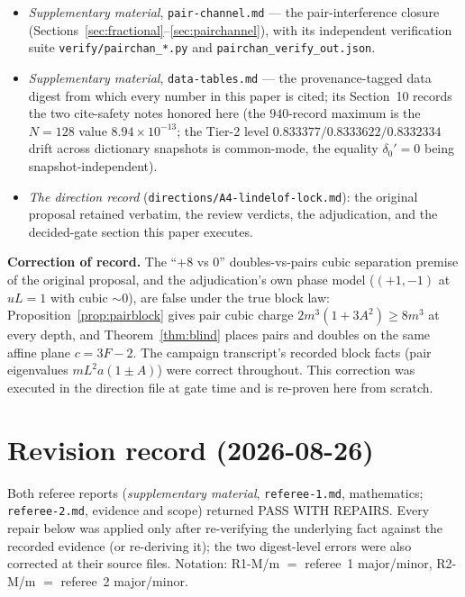 \documentclass[11pt]{article}
\theoremstyle{plain}
\theoremstyle{definition}
\theoremstyle{remark}
\begin{document}
\begin{itemize}
  with their verification scripts and JSON outputs.
\item \emph{Supplementary material}, \texttt{pair-}\allowbreak\texttt{channel.md}
  --- the pair-interference closure
  (Sections~\ref{sec:fractional}--\ref{sec:pairchannel}), with its independent
  verification suite \texttt{verify/}\allowbreak\texttt{pairchan\_*.py}
  and \texttt{pairchan\_}\allowbreak\texttt{verify\_}\allowbreak\texttt{out.json}.
\item \emph{Supplementary material}, \texttt{data-tables.md} --- the
  provenance-tagged data digest from which every number in this paper is cited;
  its Section~10 records the two cite-safety notes honored here (the $940$-record
  maximum is the $N = 128$ value $8.94 \times 10^{-13}$; the Tier-2 level
  $0.833377 / 0.8333622 / 0.8332334$ drift across dictionary snapshots is
  common-mode, the equality $\delta_0' = 0$ being snapshot-independent).
\item \emph{The direction record} (\texttt{directions/A4-lindelof-lock.md}): the original proposal retained verbatim,
  the review verdicts, the adjudication, and the decided-gate section this paper
  executes.
\end{itemize}

\textbf{Correction of record.} The ``$+8$ vs $0$'' doubles-vs-pairs cubic
separation premise of the original proposal, and the adjudication's own phase
model ($(+1, -1)$ at $uL = 1$ with cubic ${\sim}0$), are
false under the true block law: Proposition~\ref{prop:pairblock} gives pair cubic
charge $2m^3(1 + 3A^2) \ge 8m^3$ at every depth, and Theorem~\ref{thm:blind}
places pairs and doubles on the same affine plane $c = 3F - 2$. The campaign
transcript's recorded block facts (pair eigenvalues $m L^2 a (1 \pm A)$) were
correct throughout. This correction was executed in the direction file at gate
time and is re-proven here from scratch.

\section*{Revision record (2026-08-26)}

Both referee reports (\emph{supplementary material}, \texttt{referee-1.md},
mathematics; \texttt{referee-2.md}, evidence and scope) returned PASS WITH
REPAIRS. Every repair below was applied only after re-verifying the underlying
fact against the recorded evidence (or re-deriving it); the two
digest-level errors were also corrected at their source files. Notation:
R1-M/m $=$ referee~1 major/minor, R2-M/m $=$ referee~2 major/minor.
\end{document}
